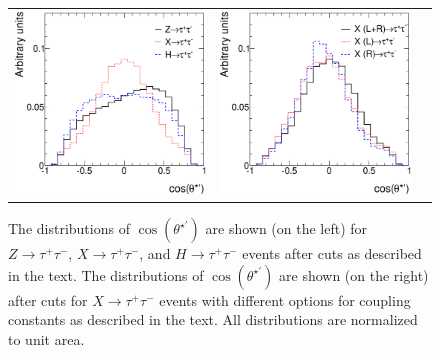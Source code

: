 \documentclass[12pt]{article}
\begin{document}
\begin{figure}[htp!]
\begin{tabular}{ccc}
\includegraphics[width=0.48\columnwidth]{hall_cstarp_cuts.eps} & 
\includegraphics[width=0.48\columnwidth]{Xtautau_0LR_8TeV_cstarp_cuts.eps} 
\end{tabular}
\caption{
The distributions of $\cos(\theta^{\star\prime})$ are shown (on the left) for $Z\to\tau^+\tau^-$, 
$X\to\tau^+\tau^-$, and $H\to\tau^+\tau^-$  events after cuts as described in the text.
The distributions of $\cos(\theta^{\star\prime})$ are shown (on the right) after cuts for $X\to\tau^+\tau^-$ events 
with different options for coupling constants as described in the text.
All distributions are normalized to unit area.
}
\label{Cstarprime_cuts}
\end{figure}
\end{document}
